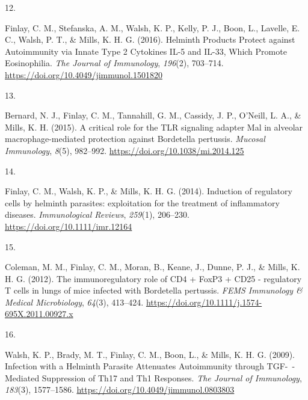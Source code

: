 \documentclass[8pt,a4paper,]{awesome-cv}
\newlength{\csllabelwidth}
\newcommand{\CSLLeftMargin}[1]{\parbox[t]{\csllabelwidth}{#1}}
\newcommand{\CSLRightInline}[1]{\parbox[t]{\linewidth - \csllabelwidth}{#1}}
\begin{document}
\leavevmode{}%
\CSLLeftMargin{12. }%
\CSLRightInline{Finlay, C. M., Stefanska, A. M., Walsh, K. P., Kelly, P.
J., Boon, L., Lavelle, E. C., Walsh, P. T., \& Mills, K. H. G. (2016).
Helminth Products Protect against Autoimmunity via Innate Type 2
Cytokines IL-5 and IL-33, Which Promote Eosinophilia. \emph{The Journal
of Immunology}, \emph{196}(2), 703--714.
\url{https://doi.org/10.4049/jimmunol.1501820}}

\leavevmode{}%
\CSLLeftMargin{13. }%
\CSLRightInline{Bernard, N. J., Finlay, C. M., Tannahill, G. M.,
Cassidy, J. P., O'Neill, L. A., \& Mills, K. H. (2015). A critical role
for the TLR signaling adapter Mal in alveolar macrophage-mediated
protection against Bordetella pertussis. \emph{Mucosal Immunology},
\emph{8}(5), 982--992. \url{https://doi.org/10.1038/mi.2014.125}}

\leavevmode{}%
\CSLLeftMargin{14. }%
\CSLRightInline{Finlay, C. M., Walsh, K. P., \& Mills, K. H. G. (2014).
Induction of regulatory cells by helminth parasites: exploitation for
the treatment of inflammatory diseases. \emph{Immunological Reviews},
\emph{259}(1), 206--230. \url{https://doi.org/10.1111/imr.12164}}

\leavevmode{}%
\CSLLeftMargin{15. }%
\CSLRightInline{Coleman, M. M., Finlay, C. M., Moran, B., Keane, J.,
Dunne, P. J., \& Mills, K. H. G. (2012). The immunoregulatory role of
CD4 + FoxP3 + CD25 - regulatory T cells in lungs of mice infected with
Bordetella pertussis. \emph{FEMS Immunology \& Medical Microbiology},
\emph{64}(3), 413--424.
\url{https://doi.org/10.1111/j.1574-695X.2011.00927.x}}

\leavevmode{}%
\CSLLeftMargin{16. }%
\CSLRightInline{Walsh, K. P., Brady, M. T., Finlay, C. M., Boon, L., \&
Mills, K. H. G. (2009). Infection with a Helminth Parasite Attenuates
Autoimmunity through TGF-~-Mediated Suppression of Th17 and Th1
Responses. \emph{The Journal of Immunology}, \emph{183}(3), 1577--1586.
\url{https://doi.org/10.4049/jimmunol.0803803}}
\end{document}
